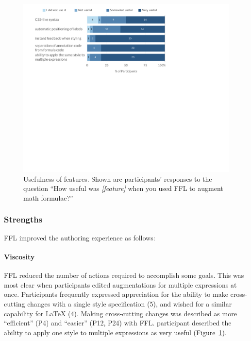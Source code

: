 \begin{figure}
    \centering
    \includegraphics[width=\linewidth]{figures/Useful.pdf}
    \vspace{-3ex}
    \caption{Usefulness of features. \normalfont Shown are participants' responses to the question ``How useful was \emph{[feature]} when you used FFL to augment math formulae?''
    }
    \label{fig:features_use}
\end{figure}

\subsubsection{Strengths} FFL improved the authoring experience as follows:

\paragraph{Viscosity}
FFL reduced the number of actions required to accomplish some goals. This was most clear when participants edited augmentations for multiple expressions at once. Participants frequently expressed appreciation for the ability to make cross-cutting changes with a single style specification (5), and wished for a similar capability for LaTeX (4). Making cross-cutting changes was described as more ``efficient'' (P4) and ``easier'' (P12, P24) with FFL.  participant described the ability to apply one style to multiple expressions as very useful (Figure~\ref{fig:features_use}).

